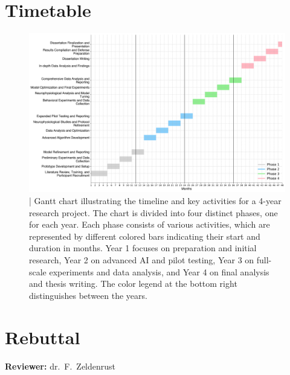 \documentclass[10pt]{article}
\begin{document}
\section*{Timetable}\label{sec:timetable}
\begin{figure}[ht!]
  \centering
  \includegraphics[width=1.0\textwidth]{imgs/Gannt_chart.png}
  \caption{| Gantt chart illustrating the timeline and key activities for a 4-year research project. The chart is divided into four distinct phases, one for each year. Each phase consists of various activities, which are represented by different colored bars indicating their start and duration in months. Year 1 focuses on preparation and initial research, Year 2 on advanced AI and pilot testing, Year 3 on full-scale experiments and data analysis, and Year 4 on final analysis and thesis writing. The color legend at the bottom right distinguishes between the years.}\label{fig:gannt_chart}
\end{figure}
\pagebreak
\printbibliography%
\pagebreak
\section*{Rebuttal}\label{sec:rebuttal}
\noindent \textbf{Reviewer:} dr.\ F.\ Zeldenrust\\
\end{document}
